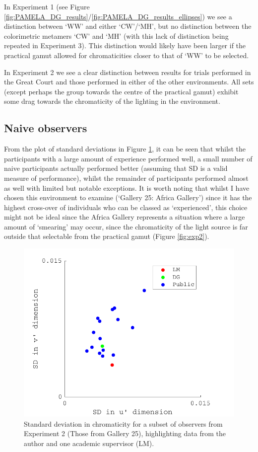 In Experiment 1 (see Figure \ref{fig:PAMELA_DG_results}/\ref{fig:PAMELA_DG_results_ellipses}) we see a distinction between `WW' and either `CW'/`MH', but no distinction between the colorimetric metamers `CW' and `MH' (with this lack of distinction being repeated in Experiment 3). This distinction would likely have been larger if the practical gamut allowed for chromaticities closer to that of `WW' to be selected. 

In Experiment 2 we see a clear distinction between results for trials performed in the Great Court and those performed in either of the other environments. All sets (except perhaps the group towards the centre of the practical gamut) exhibit some drag towards the chromaticity of the lighting in the environment.

\subsection{Naive observers}

From the plot of standard deviations in Figure \ref{fig:naive}, it can be seen that whilst the participants with a large amount of experience performed well, a small number of naive participants actually performed better (assuming that SD is a valid measure of performance), whilst the remainder of participants performed almost as well with limited but notable exceptions. It is worth noting that whilst I have chosen this environment to examine (`Gallery 25: Africa Gallery') since it has the highest cross-over of individuals who can be classed as `experienced', this choice might not be ideal since the Africa Gallery represents a situation where a large amount of `smearing' may occur, since the chromaticity of the light source is far outside that selectable from the practical gamut (Figure \ref{fig:exp2}). 

\begin{figure}[hbtp]
\includegraphics[max width=\textwidth]{figs/tablet/naive.pdf} 
\caption{Standard deviation in chromaticity for a subset of observers from Experiment 2 (Those from Gallery 25), highlighting data from the author and one academic supervisor (LM).}
\label{fig:naive}
\end{figure}

